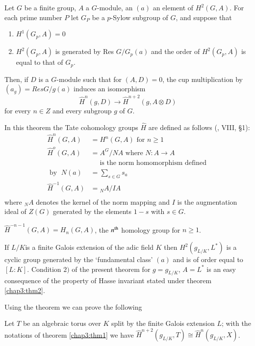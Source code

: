  \begin{thm}\label{chap3:thm4}
 Let $G$ be a finite group, $A$ a $G$-module, an $(a)$ an element of
 $H^2(G,A)$. For each prime number $P$ let $G_P$ be a $p$-Sylow subgroup
 of $G$, and suppose that   
\begin{enumerate}[1)]
\item $H^1 (G_p , A) = 0$

\item $H^2 (G_p , A)$ is generated by Res $G/G_p(a)$ and the order of
  $H^2 (G_p , A)$ is equal to that of $G_p$. 
\end{enumerate}
 
 Then, if $D$ is a $G$-module such that for $(A,D) = 0$, the cup
 multiplication by $(a_g) = Res G/g(a)$ induces an isomorphism  
 $$
 \hat{H}^n(g,D) \rightarrow \hat{H}^{n+2} (g, A \otimes D)
 $$
 for every $n \in Z$ and every subgroup $g$ of $G$.
 
 In this theorem the Tate cohomology groups $\hat{H}$ are defined as
 follows (\cite{keyS1},  VIII, \S 1): 
\begin{align*}
 \hat{H}^n(G,A) & = H^n (G, A) \text{ for  } n \ge 1\\
\hat{H}^o (G,A) & = A^G /NA \text{ where } N:A \rightarrow A \\
&\quad\text{ is
  the norm homomorphism defined }\\
\text{ by } \; N(a) & = \sum_{s \in G} s_a\\ 
\hat{H}^{-1}(G,A) &  = {}_N A / IA\\
 \end{align*}
 where ${}_N A$ denotes the kernel of the norm mapping and $I$ is the
 augmentation ideal of $Z(G)$ generated by the elements $1-s$ with $s
 \in G$. 

$\hat{H}^{-n-1}(G,A) = H_n (G,A)$, the $n^{\rm th}$ homology
 group for $n \ge 1$.  
 
 \noindent
 If $L/K$\pageoriginale is a finite Galois extension of the adic field
 $K$ then $H^2(g_{L/K}, L^*)$  is a cyclic group generated by the `fundamental
 class' $(a)$ and is of order equal to $[L:K]$. Condition $2)$ of
 the present theorem for $g = g_{L/K}$, $A = L^*$ is an easy consequence
 of the property of Hasse invariant stated under theorem \ref{chap3:thm2}. 
 \end{thm}

 Using the theorem we can prove the following

 \begin{thm}\label{chap3:thm5}
Let $T$ be an algebraic torus over $K$ split by the finite Galois
extension $L$; with the notations of theorem \ref{chap3:thm1} we have  
$\hat{H}^{n+2} (g_{L/K}, T) \cong \hat{H}^{n} (g_{L/K}, X)$.
 \end{thm} 

